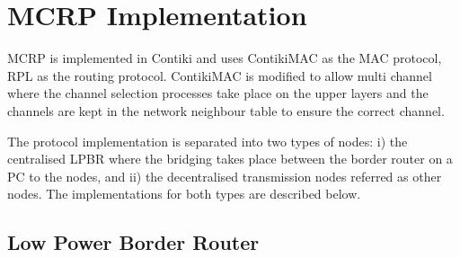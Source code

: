 

\section{MCRP Implementation}
MCRP is implemented in Contiki and uses ContikiMAC as the MAC protocol, RPL as the routing protocol. ContikiMAC is modified to allow multi channel where the channel selection processes take place on the upper layers and the channels are kept in the network neighbour table to ensure the correct channel.

The protocol implementation is separated into two types of nodes: i) the centralised LPBR where the bridging takes place between the border router on a PC to the nodes, and ii) the decentralised transmission nodes referred as other nodes. The implementations for both types are described below.



\subsection{Low Power Border Router}

